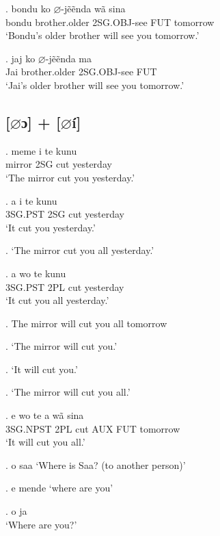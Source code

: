 \documentclass{assets/fieldnotes}
\begin{document}
\exg. bondu ko $\varnothing$-jẽẽnda wã sina \\
bondu brother.older 2SG.OBJ-see FUT tomorrow \\
`Bondu's older brother will see you tomorrow.'

\ex. jaj ko $\varnothing$-jẽẽnda ma \\
Jai brother.older 2SG.OBJ-see FUT \\
`Jai's older brother will see you tomorrow.'

\subsection{[$\varnothing$ɔ] + [$\varnothing$í]}


\exg. meme i te kunu \\
mirror 2SG cut yesterday \\
`The mirror cut you yesterday.'

\exg. a i te kunu \\
3SG.PST 2SG cut yesterday \\
`It cut you yesterday.'


\ex. `The mirror cut you all yesterday.'

\ex. a wo te kunu \\
3SG.PST 2PL cut yesterday \\
`It cut you all yesterday.'

\ex. The mirror will cut you all tomorrow


\ex. `The mirror will cut you.'

\ex. `It will cut you.'

\ex. `The mirror will cut you all.'

\exg. e wo te a wã sina \\
3SG.NPST 2PL cut AUX FUT tomorrow \\
`It will cut you all.'

\ex. o saa
`Where is Saa? (to another person)' 


\exg. e mende
`where are you'

\ex. o ja \\
`Where are you?'
\end{document}
